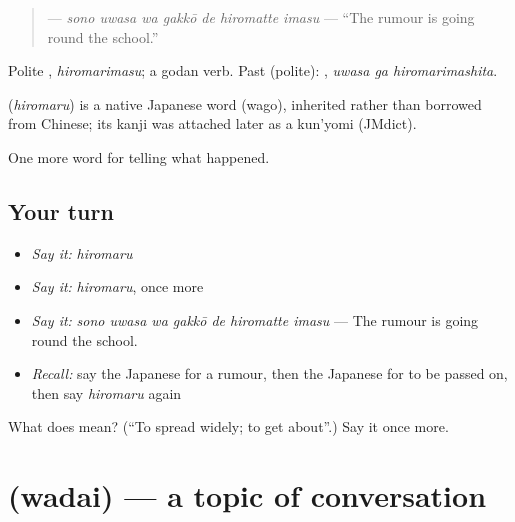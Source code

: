 \begin{quote}
\textbf{   } — \emph{sono uwasa wa gakkō de hiromatte imasu} — \textquotedblleft{}The rumour is going round the school.\textquotedblright{}
\end{quote}

Polite \textbf{}, \emph{hiromarimasu}; a godan verb. Past (polite): \textbf{ }, \emph{uwasa ga hiromarimashita}.

\begin{cousinweb}
\textbf{} (\emph{hiromaru}) is a native Japanese word (wago), inherited rather than borrowed from Chinese; its kanji was attached later as a kun'yomi (JMdict).
\end{cousinweb}

\begin{grammarlens}[title={What you've built}]
One more word for telling what happened.
\end{grammarlens}

\subsection*{Your turn}
\begin{itemize}
\raggedright
  \item \emph{Say it:} \emph{hiromaru}
  \item \emph{Say it:} \emph{hiromaru}, once more
  \item \emph{Say it:} \emph{sono uwasa wa gakkō de hiromatte imasu} — The rumour is going round the school.
  \item \emph{Recall:} say the Japanese for a rumour, then the Japanese for to be passed on, then say \emph{hiromaru} again
\end{itemize}

\begin{tcolorbox}[breakable,colback=teal!4,colframe=teal!35!black,title={Before you move on}]
What does  mean? (\textquotedblleft{}To spread widely; to get about\textquotedblright{}.) Say it once more.
\end{tcolorbox}
\section[\texorpdfstring{\ja{わだい} (wadai)}{わだい (wadai)}]{ (wadai) — a topic of conversation}

\label{lesson:JA-C281-wadai}



